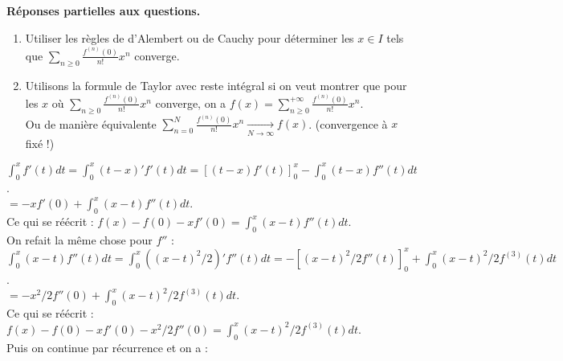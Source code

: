 \documentclass{article}
\begin{document}
\textbf{Réponses partielles aux questions.}
\begin{enumerate}
    \item Utiliser les règles de d'Alembert ou de Cauchy pour déterminer les $x \in I$ tels que $\sum_{n\geq0} \frac{f^{(n)}(0)}{n!} x^n$ converge.
    \item Utilisons la formule de Taylor avec reste intégral si on veut montrer que pour les $x$ où $\sum_{n\geq0} \frac{f^{(n)}(0)}{n!} x^n$ converge, on a $f(x) = \sum_{n\geq0}^{+\infty} \frac{f^{(n)}(0)}{n!} x^n$.\\
    Ou de manière équivalente $\sum_{n=0}^{N} \frac{f^{(n)}(0)}{n!} x^n \xrightarrow[N\to\infty]{} f(x)$. (convergence à $x$ fixé !)
\end{enumerate}


$\int_{0}^{x} f'(t) dt = \int_{0}^{x} (t - x)' f'(t) dt = [(t-x)f'(t)]_{0}^{x} - \int_{0}^{x} (t-x) f''(t) dt$.\\
$= -x f'(0) + \int_{0}^{x} (x-t) f''(t) dt$.\\
Ce qui se réécrit : $f(x) - f(0) - xf'(0) = \int_{0}^{x} (x-t) f''(t) dt$.\\
On refait la même chose pour $f''$ :\\
$\int_{0}^{x} (x-t) f''(t) dt = \int_{0}^{x} ((x-t)^2/2)' f''(t) dt = - [(x-t)^2/2 f''(t)]_{0}^{x} + \int_{0}^{x} (x-t)^2/2 f^{(3)}(t) dt$.\\
$= -x^2/2 f''(0) + \int_{0}^{x} (x-t)^2/2 f^{(3)}(t) dt$.\\
Ce qui se réécrit : $f(x) - f(0) - xf'(0) - x^2/2 f''(0) = \int_{0}^{x} (x-t)^2/2 f^{(3)}(t) dt$.\\
Puis on continue par récurrence et on a :

\end{document}
